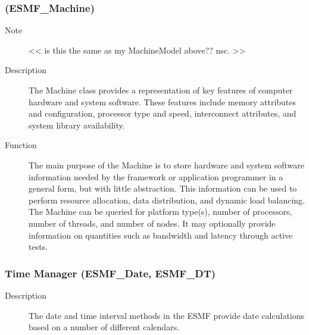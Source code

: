 \subsubsection{ (ESMF\_Machine)} 
\begin{description}
\item [Note] << is this the same as my MachineModel above??  nsc. >>
\item [Description] The Machine class provides a representation of 
key features of computer hardware and system software.  These
features include memory attributes and configuration, processor type and speed,
interconnect attributes, and system library availability.
\item [Function]
The main purpose of the Machine is to store hardware and system software
information needed by the framework or application programmer in a general
form, but with little abstraction.  This information can be used to perform resource 
allocation, data distribution, and dynamic load balancing.  The Machine can be queried
for platform type(s), number of processors, number of threads, and number of 
nodes.  It may optionally provide information on quantities such as bandwidth and 
latency through active tests.  
\end{description}

\subsubsection{Time Manager (ESMF\_Date, ESMF\_DT)}
\begin{description}
\item [Description] The date and time interval methods in the ESMF provide date
calculations based on a number of different calendars.

\end{description}
















